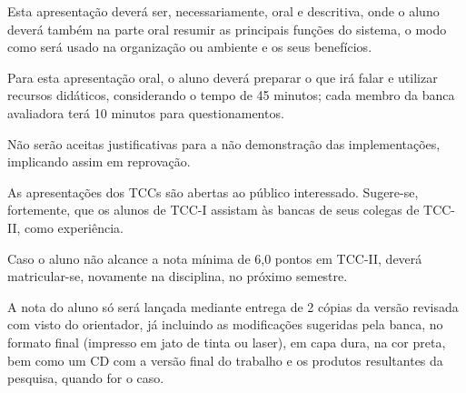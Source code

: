 Esta apresentação deverá ser, necessariamente, oral e descritiva, onde o aluno deverá também na parte oral resumir as principais funções do sistema, o modo como será usado na organização ou ambiente e os seus benefícios.

Para esta apresentação oral, o aluno deverá preparar o que irá falar e utilizar recursos didáticos, considerando o tempo de 45 minutos; cada membro da banca avaliadora terá 10 minutos para questionamentos.

Não serão aceitas justificativas para a não demonstração das implementações, implicando assim em reprovação.

As apresentações dos TCCs são abertas ao público interessado. Sugere-se, fortemente, que os alunos de TCC-I assistam às bancas de seus colegas de TCC-II, como experiência.

Caso o aluno não alcance a nota mínima de 6,0 pontos em TCC-II, deverá matricular-se, novamente na disciplina, no próximo semestre.
	
A nota do aluno só será lançada mediante entrega de 2 cópias da versão revisada com visto do orientador, já incluindo as modificações sugeridas pela banca, no formato final (impresso em jato de tinta ou laser), em capa dura, na cor preta, bem como um CD com a versão final do trabalho e os produtos resultantes da pesquisa, quando for o caso.

	
